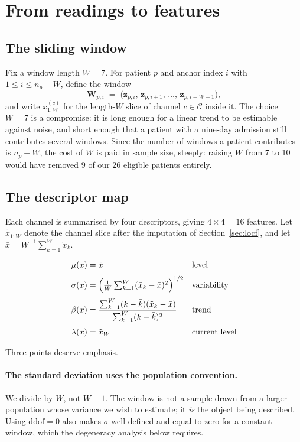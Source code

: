 \documentclass[11pt,a4paper]{article}
\begin{document}
\section{From readings to features}
\label{sec:features}

\subsection{The sliding window}

Fix a window length $W=7$. For patient $p$ and anchor index $i$ with
$1 \le i \le n_p - W$, define the window
\[
  \mathbf{W}_{p,i} \;=\; \bigl(\mathbf{z}_{p,i},\,\mathbf{z}_{p,i+1},\,\dots,\,
                                \mathbf{z}_{p,i+W-1}\bigr),
\]
and write $x^{(c)}_{1:W}$ for the length-$W$ slice of channel $c\in\mathcal{C}$
inside it. The choice $W=7$ is a compromise: it is long enough for a linear trend
to be estimable against noise, and short enough that a patient with a nine-day
admission still contributes several windows. Since the number of windows a patient
contributes is $n_p - W$, the cost of $W$ is paid in sample size, steeply: raising
$W$ from 7 to 10 would have removed $9$ of our $26$ eligible patients entirely.

\subsection{The descriptor map}

Each channel is summarised by four descriptors, giving
$4\times 4 = 16$ features. Let $\tilde{x}_{1:W}$ denote the channel slice after
the imputation of Section~\ref{sec:locf}, and let
$\bar{x} = W^{-1}\sum_{k=1}^{W}\tilde{x}_k$.

\begin{align}
  \mu(x)        &= \bar{x} &&\text{level} \label{eq:mean}\\[1mm]
  \sigma(x)     &= \Bigl(\tfrac{1}{W}\textstyle\sum_{k=1}^{W}(\tilde{x}_k-\bar{x})^2\Bigr)^{1/2}
                 &&\text{variability} \label{eq:std}\\[1mm]
  \beta(x)      &= \frac{\sum_{k=1}^{W}(k-\bar{k})(\tilde{x}_k-\bar{x})}
                        {\sum_{k=1}^{W}(k-\bar{k})^{2}}
                 &&\text{trend} \label{eq:trend}\\[1mm]
  \lambda(x)    &= \tilde{x}_W &&\text{current level} \label{eq:last}
\end{align}

Three points deserve emphasis.

\paragraph{The standard deviation uses the population convention.}
We divide by $W$, not $W-1$. The window is not a sample drawn from a larger
population whose variance we wish to estimate; it \emph{is} the object being
described. Using $\mathrm{ddof}=0$ also makes $\sigma$ well defined and equal to
zero for a constant window, which the degeneracy analysis below requires.
\end{document}
